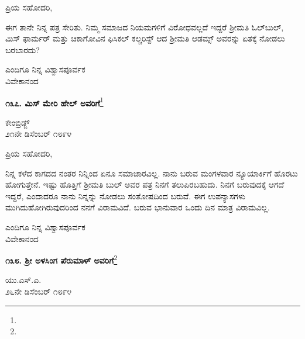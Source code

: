 \noindent
ಪ್ರಿಯ ಸಹೋದರಿ,

ಈಗ ತಾನೇ ನಿನ್ನ ಪತ್ರ ಸೇರಿತು. ನಿಮ್ಮ ಸಮಾಜದ ನಿಯಮಗಳಿಗೆ ವಿರೋಧವಲ್ಲದೆ ಇದ್ದರೆ ಶ‍್ರೀಮತಿ ಓಲ್‌ಬುಲ್, ಮಿಸ್ ಫಾರ್ಮರ್ ಮತ್ತು ಚಿಕಾಗೋವಿನ ಫಿಸಿಕಲ್ ಕಲ್ಚರಿಸ್ಟ್ ಆದ ಶ‍್ರೀಮತಿ ಆಡಮ್ಸ್ ಅವರನ್ನು ಏತಕ್ಕೆ ನೋಡಲು ಬರಬಾರದು?

\vspace{-0.4cm}

{\flushright
ಎಂದಿಗೂ ನಿನ್ನ ವಿಶ್ವಾಸಪೂರ್ವಕ\\ವಿವೇಕಾನಂದ\par}

\begin{center}
\textbf{೧೩೭. ಮಿಸ್ ಮೇರಿ ಹೇಲ್ ಅವರಿಗೆ}\footnote{}
\end{center}

\vspace{-0.7cm}

\begin{flushright}
ಕೇಂಬ್ರಿಡ್ಜ್\\೨೧ನೇ ಡಿಸೆಂಬರ್ ೧೮೯೪
\end{flushright}

\vspace{-0.6cm}

\noindent
ಪ್ರಿಯ ಸಹೋದರಿ,

ನಿನ್ನ ಕಳೆದ ಕಾಗದದ ನಂತರ ನಿನ್ನಿಂದ ಏನೂ ಸಮಾಚಾರವಿಲ್ಲ. ನಾನು ಬರುವ ಮಂಗಳವಾರ ನ್ಯೂಯಾರ್ಕಿಗೆ ಹೊರಟು ಹೋಗುತ್ತೇನೆ. ಇಷ್ಟು ಹೊತ್ತಿಗೆ ಶ‍್ರೀಮತಿ ಬುಲ್ ಅವರ ಪತ್ರ ನಿನಗೆ ತಲುಪಿರಬಹುದು. ನಿನಗೆ ಬರುವುದಕ್ಕೆ ಆಗದೆ ಇದ್ದರೆ, ಎಂದಾದರೂ ನಾನು ನಿನ್ನನ್ನು ನೋಡಲು ಸಂತೋಷದಿಂದ ಬರುವೆ. ಈಗ ಉಪನ್ಯಾಸಗಳು ಮುಗಿದುಹೋಗಿರುವುದರಿಂದ ನನಗೆ ವಿರಾಮವಿದೆ. ಬರುವ ಭಾನುವಾರ ಒಂದು ದಿನ ಮಾತ್ರ ವಿರಾಮವಿಲ್ಲ.

\vspace{-0.6cm}

{\flushright
ಎಂದಿಗೂ ನಿನ್ನ ವಿಶ್ವಾಸಪೂರ್ವಕ\\ವಿವೇಕಾನಂದ\par}

\newpage

\begin{center}
\textbf{೧೩೮. ಶ‍್ರೀ ಅಳಸಿಂಗ ಪೆರುಮಾಳ್ ಅವರಿಗೆ}\footnote{}
\end{center}

\vspace{-0.7cm}

\begin{flushright}
ಯು.ಎಸ್.ಎ.\\೨೬ನೇ ಡಿಸೆಂಬರ್ ೧೮೯೪
\end{flushright}

\vspace{-0.6cm}

